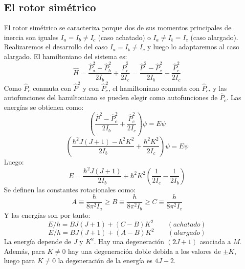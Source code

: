 \documentclass[a4paper]{article}
\begin{document}
\subsection{El rotor simétrico}
El rotor simétrico se caracteriza porque dos de sus momentos principales de inercia son iguales $I_a=I_b\neq I_c$ (caso achatado) o $I_a\neq I_b=I_c$ (caso alargado). Realizaremos el desarrollo del caso $I_a=I_b\neq I_c$ y luego lo adaptaremos al caso alargado. 
El hamiltoniano del sistema es:
\begin{equation}
\hat H=\frac{\hat P_a^2+\hat P_b^2}{2I_b}+\frac{\hat P_c^2}{2I_c}=\frac{\hat P^2- \hat P_c^2}{2I_b}+\frac{\hat P_c^2}{2I_c}
\end{equation}
Como $\hat P_c$ conmuta con $\hat P^2$ y con $\hat P_c^2$, el hamiltoniano conmuta con $\hat P_c$, y las autofunciones del hamiltoniano se pueden elegir como autofunciones de $\hat P_c$.
Las energías se obtienen como: $$\left(\frac{\hat P^2- \hat P_c^2}{2I_b}+\frac{\hat P_c^2}{2I_c}\right)\psi=E\psi$$
 $$\left(\frac{\hbar^2J(J+1)- \hbar^2K^2}{2I_b}+\frac{\hbar^2K^2}{2I_c}\right)\psi=E\psi$$
 Luego:
 \begin{equation}
 E=\frac{\hbar^2J(J+1)}{2I_b}+\hbar^2K^2\left(\frac{1}{2I_c}-\frac{1}{2I_b}\right)
 \end{equation}
 Se definen las constantes rotacionales como:
 \begin{equation}
 A \equiv \frac{h}{8\pi^2I_a}\geq B\equiv \frac{h}{8\pi^2I_b}\geq C\equiv \frac{h}{8\pi^2I_c}
 \end{equation}
 Y las energías son por tanto:
 \begin{equation}
 E/h=BJ\left(J+1\right)+\left(C-B\right)K^2 \qquad (achatado)
 \end{equation}
 \begin{equation}
 E/h=BJ\left(J+1\right)+\left(A-B\right)K^2 \qquad (alargado)
 \end{equation}
La energía depende de $J$ y $K^2$. Hay una degeneración $(2J+1)$ asociada a $M$. Además, para $K\neq 0$ hay una degeneración doble debida a los valores de $\pm K$, luego para $K\neq 0$ la degeneración de la energía es $4J+2$.
\end{document}
